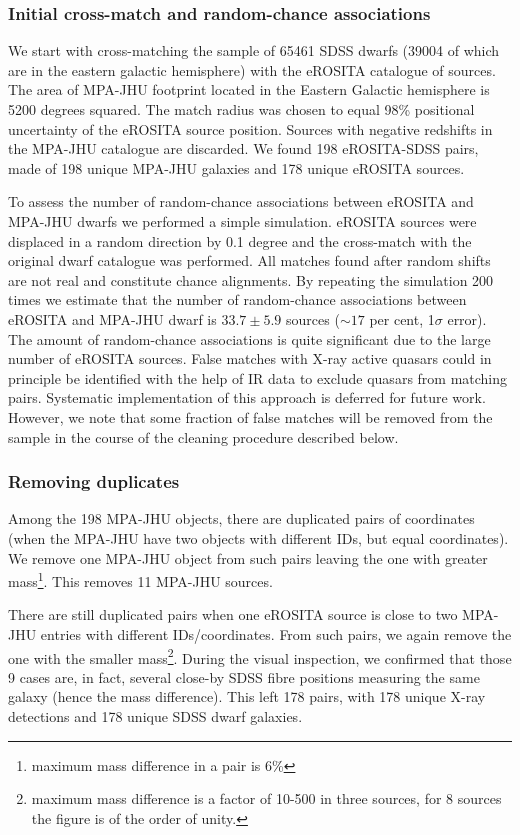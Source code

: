 \documentclass[fleqn,usenatbib]{mnras}
\begin{document}
\subsubsection*{Initial cross-match and random-chance associations} 

We start with cross-matching the sample of 65461 SDSS dwarfs (39004 of which are in the eastern galactic hemisphere) with the eROSITA catalogue of sources. The area of MPA-JHU footprint located in the Eastern Galactic hemisphere is 5200 degrees squared. The match radius was chosen to equal 98\% positional uncertainty of the eROSITA source position.  
Sources with negative redshifts in the MPA-JHU catalogue are discarded.  We found 198 
eROSITA-SDSS pairs, made of 198 unique MPA-JHU galaxies and 178 unique eROSITA sources.

To assess the number of random-chance associations between eROSITA and MPA-JHU dwarfs we performed a simple simulation.  eROSITA sources were displaced in a random direction by 
0.1 degree and the cross-match with the original dwarf catalogue was performed. All matches found after random shifts are not real and constitute chance alignments. By repeating the simulation 200 times we estimate that the number of random-chance associations between eROSITA and MPA-JHU dwarf is $33.7\pm5.9$ sources ($\sim17$ per cent, 1$\sigma$ error). The amount of random-chance associations is quite significant due to the large number of eROSITA sources. False matches with X-ray active quasars could in principle be identified with  the help of IR data to exclude quasars from matching pairs. Systematic implementation of this approach is deferred for future work. However, we note that some fraction of false matches will be removed from the sample in the course of the cleaning procedure described below.


\subsubsection*{Removing duplicates}


Among the 198 MPA-JHU objects, there are duplicated pairs of coordinates (when the MPA-JHU have two objects with different IDs, but equal coordinates). We remove one MPA-JHU object from such pairs leaving the one with greater mass\footnote{maximum mass difference in a pair is 6\%}. This removes 11 MPA-JHU sources.

There are still duplicated pairs when one eROSITA source is close to two MPA-JHU entries with different IDs/coordinates. From such pairs, we again remove the one with the smaller mass\footnote{maximum mass difference is a factor of 10-500 in three sources, for 8 sources the figure is of the order of unity.}. During the visual inspection, we confirmed that those 9 cases are, in fact, several close-by SDSS fibre positions measuring the same galaxy (hence the mass difference). This left 178 pairs, with 178 unique X-ray detections and 178 unique SDSS dwarf galaxies. 
\end{document}
